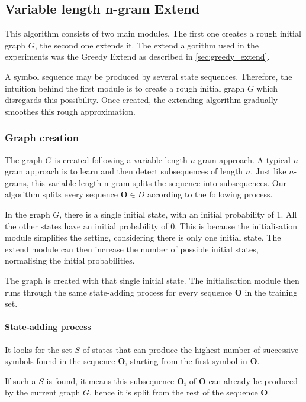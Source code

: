\subsection{Variable length n-gram Extend}
\label{sec:vl-ngram-extend}
This algorithm consists of two main modules. The first one creates a rough initial graph $G$, the second one extends it. The extend algorithm used in the experiments was the Greedy Extend as described in \ref{sec:greedy_extend}.

A symbol sequence may be produced by several state sequences. Therefore, the intuition behind the first module is to create a rough initial graph $G$ which disregards this possibility. Once created, the extending algorithm gradually smoothes this rough approximation.

\subsubsection{Graph creation}

The graph $G$ is created following a variable length $n$-gram approach. A typical $n$-gram approach is to learn and then detect subsequences of length $n$. Just like $n$-grams, this variable length n-gram splits the sequence into subsequences. Our algorithm splits every sequence $\mathbf{O}\in D$ according to the following process.

In the graph $G$, there is a single initial state, with an initial probability of 1. All the other states have an initial probability of 0. This is because the initialisation module simplifies the setting, considering there is only one initial state. The extend module can then increase the number of possible initial states, normalising the initial probabilities.

The graph is created with that single initial state. The initialisation module then runs through the same state-adding process for every sequence $\mathbf{O}$ in the training set.

\paragraph{State-adding process}

It looks for the set $S$ of states that can produce the highest number of successive symbols found in the sequence $\mathbf{O}$, starting from the first symbol in $\mathbf{O}$.

If such a $S$ is found, it means this subsequence $\mathbf{O_i}$ of $\mathbf{O}$ can already be produced by the current graph $G$, hence it is split from the rest of the sequence $\mathbf{O}$. 

